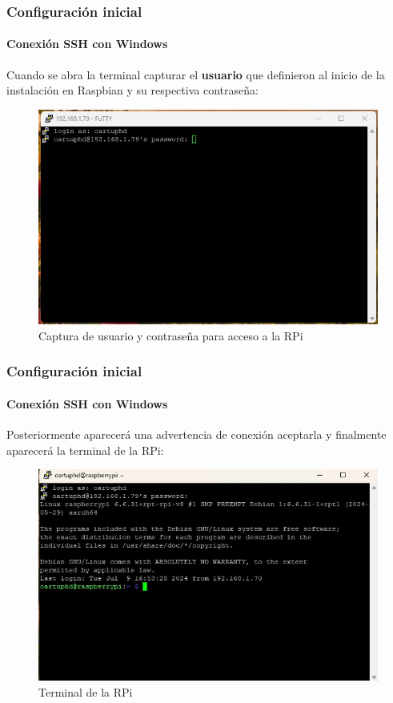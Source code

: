 \documentclass{beamer}
\begin{document}
	\begin{frame}
		\frametitle{Configuración inicial}
		\framesubtitle{Conexión SSH con Windows}
		Cuando se abra la terminal capturar el \textbf{usuario} que definieron al inicio de la instalación en Raspbian y su respectiva contraseña:
		\begin{figure}
			\includegraphics[scale=0.49]{putty2.jpeg}
			\caption{Captura de usuario y contraseña para acceso a la RPi}
		\end{figure}
		
	\end{frame}
	
	\begin{frame}
		\frametitle{Configuración inicial}
		\framesubtitle{Conexión SSH con Windows}
		Posteriormente aparecerá una advertencia de conexión aceptarla y finalmente aparecerá la terminal de la RPi:
		\begin{figure}
			\includegraphics[scale=0.5]{putty3.jpeg}
			\caption{Terminal de la RPi}
		\end{figure}
		
	\end{frame}
\end{document}
